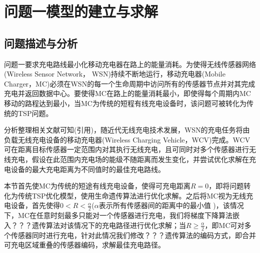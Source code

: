 \documentclass{whutmod}
\newcommand{\upcite}[1]{\textsuperscript{\cite{#1}}}
\begin{document}
	\section{问题一模型的建立与求解}
		\subsection{问题描述与分析}

%			
%
		
			问题一要求充电路线最小化移动充电器在路上的能量消耗。为使得无线传感器网络
		(Wireless Sensor Network，	WSN)持续不断地运行，移动充电器(Mobile Charger，MC)必须在WSN的每一个生命周期中访问所有的传感器节点并对其完成充电并返回数据中心。要使得MC在路上的能量消耗最小，即使得每个周期内MC移动的路程达到最小，当MC为传统的短程有线充电设备时，该问题可被转化为传统的TSP问题。
		    
		    分析整理相关文献可知(引用)，随近代无线充电技术发展，WSN的充电任务将由负载无线充电设备的移动充电器(Wireless Charging Vehicle，WCV)完成。WCV可在距离目标传感器一定范围内对其执行无线充电，且可同时对多个传感器进行无线充电，假设在此范围内充电场的能级不随距离而发生变化，并尝试优化求解在充电设备的最大充电距离为不同值时的最佳充电路线。
		    
		    本节首先使MC为传统的短途有线充电设备，使得可充电距离$R=0$，即将问题转化为传统TSP优化模型，使用生命遗传算法进行优化求解。之后将MC视为无线充电设备，首先使得$0<R<\frac{\alpha }{2}$($\alpha$表示所有传感器间的距离中的最小值 )，该情况下，MC在任意时刻最多只能对一个传感器进行充电，我们将梯度下降算法嵌入？？？遗传算法对该情况下的充电路径进行优化求解；当$R\geqslant \frac{\alpha }{2}$，即MC可对多个传感器同时进行充电，针对此情况我们修改？？？遗传算法的编码方式，即合并可充电区域重叠的传感器编码，求解最佳充电路径。
			
			
		
\end{document}
